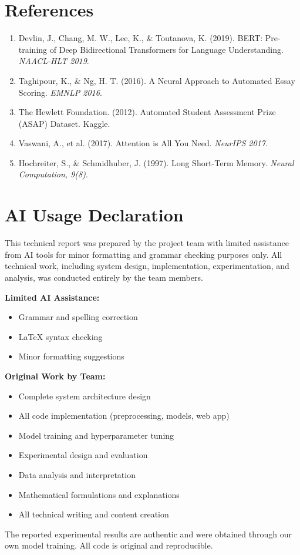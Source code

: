 \documentclass[12pt,a4paper]{article}
\begin{document}
\newpage
\section*{References}

\begin{enumerate}
    \item Devlin, J., Chang, M. W., Lee, K., \& Toutanova, K. (2019). BERT: Pre-training of Deep Bidirectional Transformers for Language Understanding. \textit{NAACL-HLT 2019}.
    
    \item Taghipour, K., \& Ng, H. T. (2016). A Neural Approach to Automated Essay Scoring. \textit{EMNLP 2016}.
    
    \item The Hewlett Foundation. (2012). Automated Student Assessment Prize (ASAP) Dataset. Kaggle.
    
    \item Vaswani, A., et al. (2017). Attention is All You Need. \textit{NeurIPS 2017}.
    
    \item Hochreiter, S., \& Schmidhuber, J. (1997). Long Short-Term Memory. \textit{Neural Computation, 9(8)}.
\end{enumerate}

\newpage
\section*{AI Usage Declaration}

This technical report was prepared by the project team with limited assistance from AI tools for minor formatting and grammar checking purposes only. All technical work, including system design, implementation, experimentation, and analysis, was conducted entirely by the team members.

\textbf{Limited AI Assistance:}
\begin{itemize}
    \item Grammar and spelling correction
    \item LaTeX syntax checking
    \item Minor formatting suggestions
\end{itemize}

\textbf{Original Work by Team:}
\begin{itemize}
    \item Complete system architecture design
    \item All code implementation (preprocessing, models, web app)
    \item Model training and hyperparameter tuning
    \item Experimental design and evaluation
    \item Data analysis and interpretation
    \item Mathematical formulations and explanations
    \item All technical writing and content creation
\end{itemize}

The reported experimental results are authentic and were obtained through our own model training. All code is original and reproducible.
\end{document}
